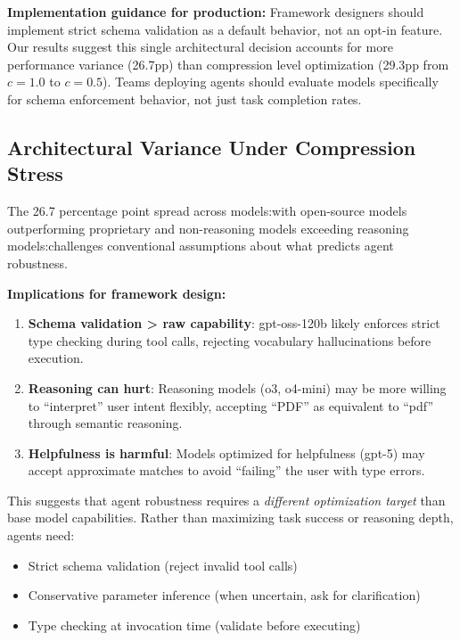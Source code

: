 \documentclass[11pt]{article}
\begin{document}
\textbf{Implementation guidance for production:} Framework designers should implement strict schema validation as a default behavior, not an opt-in feature. Our results suggest this single architectural decision accounts for more performance variance (26.7pp) than compression level optimization (29.3pp from $c=1.0$ to $c=0.5$). Teams deploying agents should evaluate models specifically for schema enforcement behavior, not just task completion rates.

\subsection{Architectural Variance Under Compression Stress}

The 26.7 percentage point spread across models:with open-source models outperforming proprietary and non-reasoning models exceeding reasoning models:challenges conventional assumptions about what predicts agent robustness.

\textbf{Implications for framework design:}

\begin{enumerate}
\item \textbf{Schema validation > raw capability}: gpt-oss-120b likely enforces strict type checking during tool calls, rejecting vocabulary hallucinations before execution.

\item \textbf{Reasoning can hurt}: Reasoning models (o3, o4-mini) may be more willing to ``interpret'' user intent flexibly, accepting ``PDF'' as equivalent to ``pdf'' through semantic reasoning.

\item \textbf{Helpfulness is harmful}: Models optimized for helpfulness (gpt-5) may accept approximate matches to avoid ``failing'' the user with type errors.
\end{enumerate}

This suggests that agent robustness requires a \emph{different optimization target} than base model capabilities. Rather than maximizing task success or reasoning depth, agents need:

\begin{itemize}
\item Strict schema validation (reject invalid tool calls)
\item Conservative parameter inference (when uncertain, ask for clarification)
\item Type checking at invocation time (validate before executing)
\end{itemize}
\end{document}
